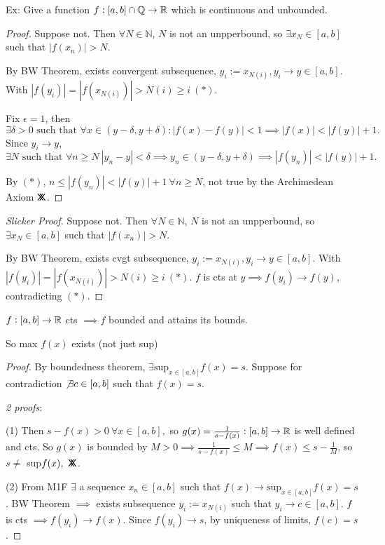 Ex: Give a function $f: [a,b] \cap \mathbb{Q} \to \mathbb{R}$ which is continuous and unbounded. 

\begin{proof}[Proof]
Suppose not. Then $\forall N \in \mathbb{N}$, $N$ is not an unpperbound, so $\exists x_N \in [a,b]$ such that $|f(x_n)| > N$.

By BW Theorem, exists convergent subsequence, $y_i := x_{N(i)}, y_i \to y \in [a,b]$. With $|f(y_i)| = |f(x_{N(i)})| > N(i) \geq i ~(*)$. 

Fix $\epsilon =1$, then 
\[\exists \delta > 0\text{ such that }\forall x \in (y-\delta, y + \delta): |f(x) - f(y)| < 1 \implies |f(x)| < |f(y)| +1.\]
 Since $y_i \to y$, 
 \[\exists N\text{ such that }\forall n \geq N~ |y_n - y| < \delta \implies y_n \in (y-\delta, y + \delta) \implies |f(y_n)| < |f(y)| + 1.\]
 
 By $(*)$, $n \leq |f(y_n)| < |f(y)| + 1~ \forall n \geq N$, not true by the Archimedean Axiom $\mathsf{X}\mkern-8.5mu\mathsf{X}$.
\end{proof}

\begin{proof}[Slicker Proof]
	Suppose not. Then $\forall N \in \mathbb{N}$, $N$ is not an unpperbound, so $\exists x_N \in [a,b]$ such that $|f(x_n)| > N$.
	
By BW Theorem, exists cvgt subsequence, $y_i := x_{N(i)}, y_i \to y \in [a,b]$. With $|f(y_i)| = |f(x_{N(i)})| > N(i) \geq i ~(*)$. $f$ is cts at $y \implies f(y_i) \to f(y)$, contradicting $(*)$.  
\end{proof}\vspace*{5pt}


\vspace*{5pt}
\begin{theorem} $f: [a,b] \to \mathbb{R}$ cts $\implies f$ bounded and attains its bounds.
\end{theorem}

So max $f(x)$ exists (not just sup)

\begin{proof}[Proof]
	By boundedness theorem, $\exists \displaystyle{\text{sup}_{x \in [a,b]}} f(x) = s$. Suppose for contradiction $\not \exists c \in [a,b]$ such that $f(x) = s$. 
	
	\emph{2 proofs}:
	
	(1) Then $s-f(x) > 0 ~\forall x \in [a,b],$ so $g(x) = \frac{1}{s-f(x)}: [a,b] \to \mathbb{R}$ is well defined and cts. So $g(x)$ is bounded by $M > 0 \implies \frac{1}{s-f(x)} \leq M \implies f(x) \leq s - \frac{1}{M}$, so $s \neq$ sup$f(x),~\mathsf{X}\mkern-8.5mu\mathsf{X}$.\vspace*{10pt}

	(2) From M1F $\exists$ a sequence $x_n \in [a,b]$ such that $f(x) \to  \displaystyle{\text{sup}_{x \in [a,b]}} f(x) = s$. BW Theorem $\implies$ exists subsequence $y_i := x_{N(i)}$ such that $y_i \to c \in [a,b].$ $f$ is cts $\implies f(y_i) \to f(x)$. Since $f(y_i) \to s$, by uniqueness of limits, $f(c) = s$.
	\end{proof}
	
